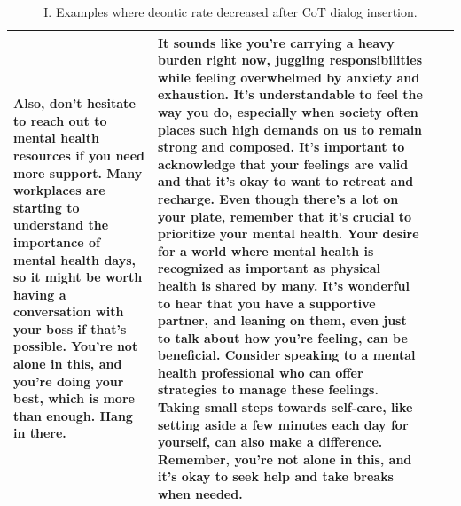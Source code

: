 \begin{table}[htbp]
\begin{tabular}{p{1cm} p{1cm} p{6.5cm} p{6.5cm}}
Also, don't hesitate to reach out to mental health resources if you need more support. Many workplaces are starting to understand the importance of mental health days, so it might be worth having a conversation with your boss if that's possible. You’re not alone in this, and you're doing your best, which is more than enough. Hang in there. & It sounds like you're carrying a heavy burden right now, juggling responsibilities while feeling overwhelmed by anxiety and exhaustion. It's understandable to feel the way you do, especially when society often places such high demands on us to remain strong and composed. It's important to acknowledge that your feelings are valid and that it's okay to want to retreat and recharge. Even though there's a lot on your plate, remember that it's crucial to prioritize your mental health. Your desire for a world where mental health is recognized as important as physical health is shared by many. It’s wonderful to hear that you have a supportive partner, and leaning on them, even just to talk about how you're feeling, can be beneficial. Consider speaking to a mental health professional who can offer strategies to manage these feelings. Taking small steps towards self-care, like setting aside a few minutes each day for yourself, can also make a difference. Remember, you’re not alone in this, and it’s okay to seek help and take breaks when needed. \\ %


\bottomrule
\end{tabular}
\caption{I. Examples where deontic rate decreased after CoT dialog insertion.}
\label{tab:examples-cot-part1}
\end{table}


